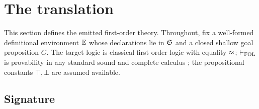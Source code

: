 \section{The translation}
\label{sec:translation}

This section defines the emitted first-order theory.  Throughout, fix a
well-formed definitional environment $\mathbb{E}$ whose declarations lie in
$\mathfrak{S}$ and a closed shallow goal proposition $G$.  The target logic is
classical first-order logic with equality $\approx$; $\vdash_{\mathrm{FOL}}$ is
provability in any standard sound and complete calculus
\cite{Shoenfield1967}; the propositional constants $\top, \bot$ are
assumed available.

\subsection{Signature}
\label{sec:translation-sig}

